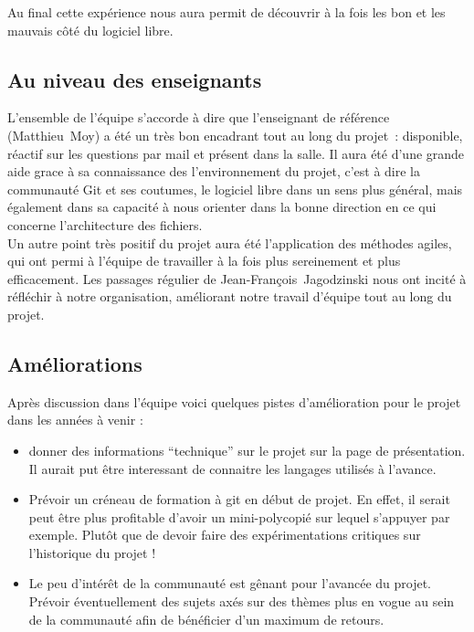 \documentclass[11pt]{article}
\begin{document}
Au final cette expérience nous aura permit de découvrir à la fois les bon
et les mauvais côté du logiciel libre.


\subsection*{Au niveau des enseignants}

L'ensemble de l'équipe s'accorde à dire que l'enseignant de
  référence (Matthieu~Moy) a été un très bon encadrant tout au long du
  projet~: disponible, réactif sur les questions par mail et présent
  dans la salle. Il aura été d'une grande aide grace à sa connaissance
  des l'environnement du projet, c'est à dire la communauté Git et ses
  coutumes, le logiciel libre dans un sens plus général, mais
  également dans sa capacité à nous orienter dans la bonne direction
  en ce qui concerne l'architecture des fichiers.
  \\
  Un autre point très positif du projet aura été l'application des
  méthodes agiles, qui ont permi à l'équipe de travailler à la fois plus
  sereinement et plus efficacement. Les passages régulier de
  Jean-François~Jagodzinski nous ont incité à réfléchir à notre
  organisation, améliorant notre travail d'équipe tout au long du projet.

\subsection*{Améliorations}

Après discussion dans l'équipe voici quelques pistes d'amélioration pour le projet dans les années à venir : 

  \begin{itemize}
  \item donner des informations ``technique'' sur le projet sur la page de présentation. Il aurait put être interessant de connaitre les langages utilisés à l'avance.
  \item Prévoir un créneau de formation à git en début de projet. En effet, il serait peut être plus profitable d'avoir un mini-polycopié sur lequel s'appuyer par exemple. Plutôt que de devoir faire des expérimentations critiques sur l'historique du projet !
  \item Le peu d'intérêt de la communauté est gênant pour l'avancée du projet. Prévoir éventuellement des sujets axés sur des thèmes plus en vogue au sein de la communauté afin de bénéficier d'un maximum de retours.
  \end{itemize}
\end{document}
